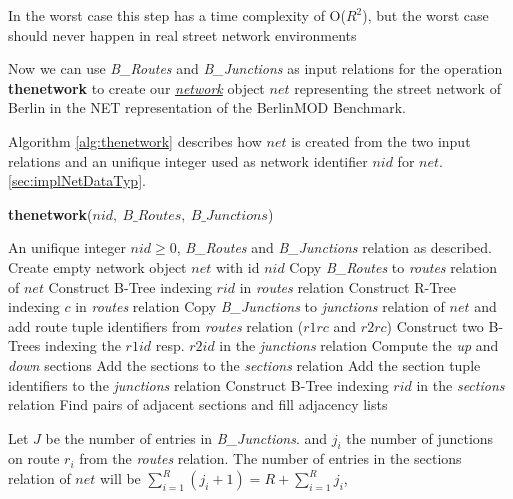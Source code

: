 \documentclass[a4paper]{article}
\newcommand{\bmodb} {BerlinMOD Benchmark}
\newcommand{\op}[1]{\textbf{#1}}
\newcommand{\dt}[1]{\textsl{\underline{#1}}}
\begin{document}
In the worst case this step has a time complexity of O($R^2$), but the worst
case should never happen in real street network environments 

Now we can use \textit{B\_Routes} and \textit{B\_Junctions} as input relations for the
operation \op{thenetwork} to create our \dt{network} object $net$ representing
the street network of Berlin in the NET representation of the \bmodb{}. 

Algorithm \ref{alg:thenetwork} describes how $net$ is created from the two input 
relations and an unifique integer used as network identifier $nid$ for $net$. 
\ref{sec:implNetDataTyp}.
\begin{algorithm}[htbp]
\caption{\op{thenetwork}($nid,\ B\_Routes,\ B\_Junctions$)}
\label{alg:thenetwork}
\begin{algorithmic}[1]
\REQUIRE An unifique integer $nid \geq 0$, \textit{B\_Routes} and \textit{B\_Junctions}
relation as described.
\STATE Create empty network object $net$ with id $nid$
\STATE Copy \textit{B\_Routes} to \textit{routes} relation of $net$
\STATE Construct B-Tree indexing $rid$ in \textit{routes} relation
\STATE Construct R-Tree indexing $c$ in \textit{routes} relation
\STATE Copy \textit{B\_Junctions} to \textit{junctions} relation of $net$ and add route tuple
identifiers from \textit{routes} relation ($r1rc$ and $r2rc$)
\STATE Construct two B-Trees indexing the $r1id$ resp. $r2id$ in the
\textit{junctions} relation
    \STATE Compute the \textit{up} and \textit{down} sections
    \STATE Add the sections to the \textit{sections} relation
    \STATE Add the section tuple identifiers to the \textit{junctions} relation
  \ENDFOR
\ENDFOR
\STATE Construct B-Tree indexing $rid$ in the \textit{sections} relation
  \STATE Find pairs of adjacent sections and fill adjacency lists
\ENDFOR
\end{algorithmic}
\end{algorithm}
Let $J$ be the number of entries in \textit{B\_Junctions}. and $j_i$ the number of
junctions on route $r_i$ from the \textit{routes} relation. The number of entries in
the sections relation of $net$ will be $\sum_{i=1}^{R}({j_i + 1}) = R +
\sum_{i=1}^{R}{j_i}$,
\end{document}
